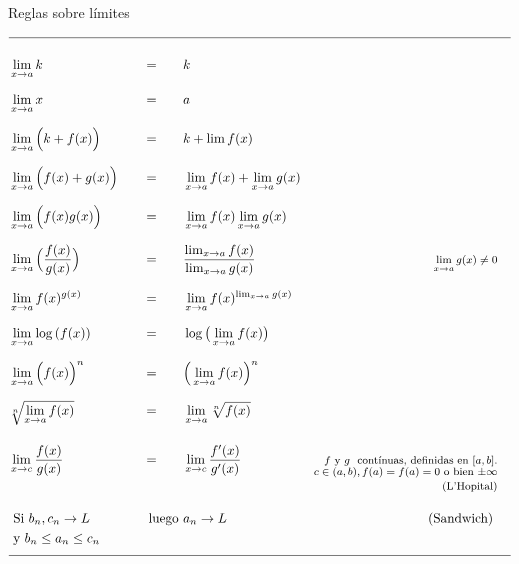 \documentclass[12pt,a4paper]{extarticle}
\begin{document}
\begin{table}[!htbp]
\caption{Reglas sobre l\'imites}
\begin{align*}
\hline \\
& \lim_{x \to a}k & = \qquad & k &\\[0.7em]
& \lim_{x \to a}x & = \qquad & a &\\[0.7em]
& \lim_{x \to a}\Big(k + f(x)\Big) & =  \qquad & k + \lim f(x)& \\[0.7em]
& \lim_{x \to a}\Big(f(x) + g(x)\Big) & =   \qquad  &   \lim_{x \to a}f(x) + \lim_{x  \to a} g(x)&  \\[0.7em]
& \lim_{x \to a}\Big(f(x) g(x)\Big) & =   \qquad  &   \lim_{x \to a}f(x) \lim_{x  \to a} g(x)&  \\[0.7em]
& \lim_{x \to a}\Big(\frac{f(x)}{g(x)}\Big) & =   \qquad
&\frac{\lim_{x \to a}f(x) }{\lim_{x  \to a} g(x)} &
\text{\footnotesize \(\lim_{x \to a}g(x) \neq 0\)} \\[0.7em]
& \lim_{x \to a}f(x)^{g(x)} & =   \qquad  & \lim_{x \to
                                            a}f(x)^{\lim_{x \to a}g(x)} &\\[0.7em]
& \lim_{x \to a} \log{(f(x))} & =   \qquad  & \log{\big(\lim_{x \to a} f(x)\big)} &\\[0.7em]
& \lim_{x \to a}\Big(f(x)\Big)^n & = \qquad & \Big(\lim_{x \to  a}f(x)\Big)^n & \\[0.7em]
& \sqrt[n]{\lim_{x \to a}f(x)} & = \qquad & \lim_{x \to
                                            a}\sqrt[n]{f(x)} & \\[1.1em]
& \lim_{x \to c}\frac{f(x)}{g(x)} & = \qquad
                             & \lim_{x \to  c} \frac{f'(x)}{g'(x)}  \qquad
                                 & \text{\footnotesize \(f \) y \( g\)   \ cont\'inuas,
                                   definidas en \([a,b]\).}\\[-0.4cm]
&&&& \text{\footnotesize \( c \in (a,b) ,  f(a) = f(a) = 0\) o bien
     \(\pm \infty\)}\\[-0.4em]
&&&& \text{\footnotesize (L'Hopital)}\\[1em]
& \text{ Si  } b_n, c_n \to L
                  & \quad \text{ luego } &  a_n \to L
                             &  \text{ (Sandwich) } &\\
& \text{ y } b_n \leq a_n \leq c_n&&&\\[0.7em]
\hline\\
\end{align*}
\label{tab:limReg}
\end{table}
\end{document}
